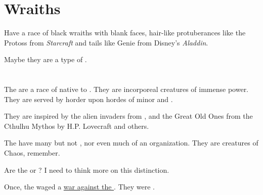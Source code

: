 \section{Wraiths}
\label{Wraiths}
\label{wraiths}
Have a race of black wraiths with blank faces, hair-like protuberances like the Protoss from \emph{Starcraft} and tails like Genie from Disney's \emph{Aladdin}. 

Maybe they are a type of \banes. 















\section{\Xzaishanns}
\label{Thzan-Tzai}
\label{Xzai-Shann}
\label{XS}
The \thzantzais{} are a race of \mdaemons{} native to \Machai. They are incorporeal creatures of immense power. They are served by horder upon hordes of minor \mdaemons{} and \mdaemons.

They are inspired by the alien invaders from , and the Great Old Ones from the Cthulhu Mythos by H.P. Lovecraft and others. 

The \xss{} have many  but not , nor even much of an organization. They are creatures of Chaos, remember. 


Are the \thzantzais{} \pdaemons{} or \mdaemons? I need to think more on this distinction.

Once, the \xzaishanns{} waged a \hyperref[XS war]{war against the \ophidians}. They were . 









